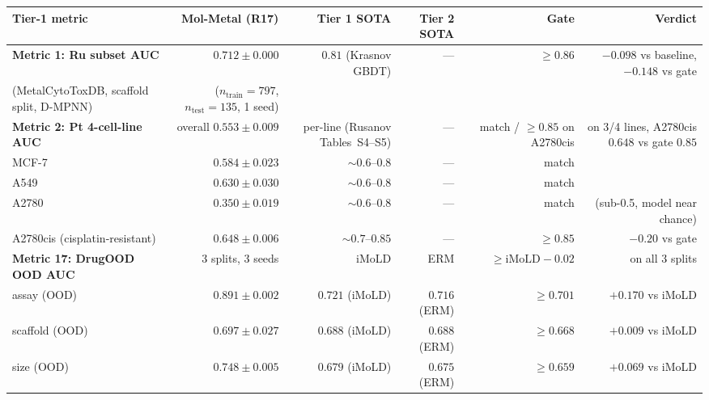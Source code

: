 \begin{table}[ht]
\centering
\small
\setlength{\tabcolsep}{4pt}
\begin{tabular}{lrrrrr}
\toprule
\textbf{Tier-1 metric} & \textbf{Mol-Metal (R17)} & \textbf{Tier 1 SOTA} & \textbf{Tier 2 SOTA} & \textbf{Gate} & \textbf{Verdict} \\
\midrule
\textbf{Metric 1: Ru subset AUC}                & $0.712 \pm 0.000$ \MEASURED{}              & $0.81$ \CITEDONLY{} (Krasnov GBDT)         & —                       & $\geq 0.86$             & \BELOWGATE{} $-0.098$ vs baseline, $-0.148$ vs gate \\
\quad (MetalCytoToxDB, scaffold split, D-MPNN) & ($n_{\mathrm{train}}{=}797$, $n_{\mathrm{test}}{=}135$, 1 seed) &                                      &                         &                         & \\
\midrule
\textbf{Metric 2: Pt 4-cell-line AUC}           & overall $0.553 \pm 0.009$ \MEASURED{} \SYNTHETIC{} & per-line (Rusanov Tables~S4--S5) & —                       & match / $\geq 0.85$ on A2780cis & \BELOWBASELINE{} on 3/4 lines, A2780cis $0.648$ vs gate $0.85$ \\
\quad MCF-7  & $0.584 \pm 0.023$ \MEASURED{} & $\sim 0.6$--$0.8$ \CITEDONLY{} & — & match & \MATCH{} \\
\quad A549   & $0.630 \pm 0.030$ \MEASURED{} & $\sim 0.6$--$0.8$ \CITEDONLY{} & — & match & \MATCH{} \\
\quad A2780  & $0.350 \pm 0.019$ \MEASURED{} & $\sim 0.6$--$0.8$ \CITEDONLY{} & — & match & \BELOWBASELINE{} (sub-0.5, model near chance) \\
\quad A2780cis (cisplatin-resistant) & $0.648 \pm 0.006$ \MEASURED{} & $\sim 0.7$--$0.85$ \CITEDONLY{} & — & $\geq 0.85$ & \BELOWGATE{} $-0.20$ vs gate \\
\midrule
\textbf{Metric 17: DrugOOD OOD AUC}             & 3 splits, 3 seeds                          & iMoLD \CITEDONLY{}                       & ERM \CITEDONLY{}        & $\geq \mathrm{iMoLD}-0.02$ & \BEAT{} on all 3 splits \\
\quad assay (OOD)    & $0.891 \pm 0.002$ \MEASURED{} & $0.721$ \CITEDONLY{} (iMoLD) & $0.716$ \CITEDONLY{} (ERM) & $\geq 0.701$ & \BEAT{} $+0.170$ vs iMoLD \\
\quad scaffold (OOD) & $0.697 \pm 0.027$ \MEASURED{} & $0.688$ \CITEDONLY{} (iMoLD) & $0.688$ \CITEDONLY{} (ERM) & $\geq 0.668$ & \BEAT{} $+0.009$ vs iMoLD \\
\quad size (OOD)     & $0.748 \pm 0.005$ \MEASURED{} & $0.679$ \CITEDONLY{} (iMoLD) & $0.675$ \CITEDONLY{} (ERM) & $\geq 0.659$ & \BEAT{} $+0.069$ vs iMoLD \\

\end{tabular}
\end{table}
